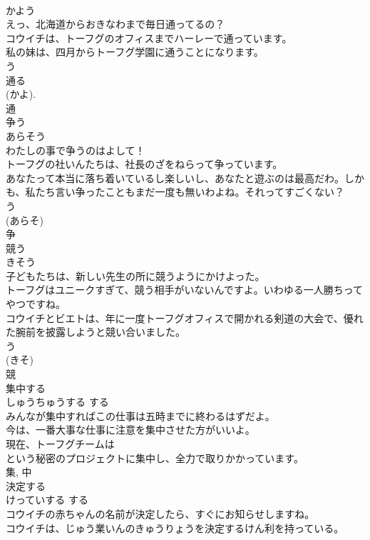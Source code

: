 \documentclass[8pt]{extreport}
\begin{document}
\begin{CJK}{UTF8}{min}
\\	かよう	
\\	えっ、北海道からおきなわまで毎日通ってるの？	
\\	コウイチは、トーフグのオフィスまでハーレーで通っています。	
\\	私の妹は、四月からトーフグ学園に通うことになります。	
\\	う 
\\	通る 
\\	(かよ). 
\\	通	
\\	争う	
\\	あらそう	
\\	わたしの事で争うのはよして！	
\\	トーフグの社いんたちは、社長のざをねらって争っています。	
\\	あなたって本当に落ち着いているし楽しいし、あなたと遊ぶのは最高だわ。しかも、私たち言い争ったこともまだ一度も無いわよね。それってすごくない？	
\\	う 
\\	(あらそ) 
\\	争	
\\	競う	
\\	きそう	
\\	子どもたちは、新しい先生の所に競うようにかけよった。	
\\	トーフグはユニークすぎて、競う相手がいないんですよ。いわゆる一人勝ちってやつですね。	
\\	コウイチとビエトは、年に一度トーフグオフィスで開かれる剣道の大会で、優れた腕前を披露しようと競い合いました。	
\\	う 
\\	(きそ) 
\\	競	
\\	集中する	
\\	しゅうちゅうする	する 
\\	みんなが集中すればこの仕事は五時までに終わるはずだよ。	
\\	今は、一番大事な仕事に注意を集中させた方がいいよ。	
\\	現在、トーフグチームは
\\	という秘密のプロジェクトに集中し、全力で取りかかっています。	
\\	集, 中	
\\	決定する	
\\	けっていする	する 
\\	コウイチの赤ちゃんの名前が決定したら、すぐにお知らせしますね。	
\\	コウイチは、じゅう業いんのきゅうりょうを決定するけん利を持っている。	

\end{CJK}
\end{document}
